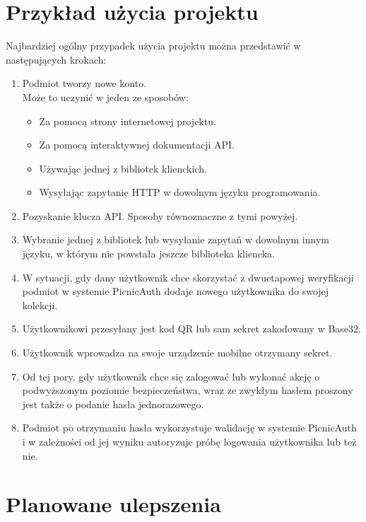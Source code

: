 \section{Przykład użycia projektu}
Najbardziej ogólny przypadek użycia projektu można przedstawić w następujących krokach:
\begin{enumerate}
	\item Podmiot tworzy nowe konto. \\ 
		Może to uczynić w jeden ze sposobów:
		\begin{itemize}
			\item Za pomocą strony internetowej projektu.
			\item Za pomocą interaktywnej dokumentacji API.
			\item Używając jednej z bibliotek klienckich.
			\item Wysyłając zapytanie HTTP w dowolnym języku programowania.
		\end{itemize}
	\item Pozyskanie klucza API. Sposoby równoznaczne z tymi powyżej.
	\item Wybranie jednej z bibliotek lub wysyłanie zapytań w dowolnym innym języku, w którym nie powstała jeszcze biblioteka kliencka.
	\item W sytuacji, gdy dany użytkownik chce skorzystać z dwuetapowej weryfikacji podmiot w systemie PicnicAuth dodaje nowego użytkownika do swojej kolekcji.
	\item Użytkownikowi przesyłany jest kod QR lub sam sekret zakodowany w Base32.
	\item Użytkownik wprowadza na swoje urządzenie mobilne otrzymany sekret.
	\item Od tej pory, gdy użytkownik chce się zalogować lub wykonać akcję o podwyższonym poziomie bezpieczeństwa, 
		wraz ze zwykłym hasłem proszony jest także o podanie hasła jednorazowego.
	\item Podmiot po otrzymaniu hasła wykorzystuje walidację w systemie PicnicAuth i w zależności od jej wyniku 
		autoryzuje próbę logowania użytkownika lub też nie.
\end{enumerate}

\section{Planowane ulepszenia}

